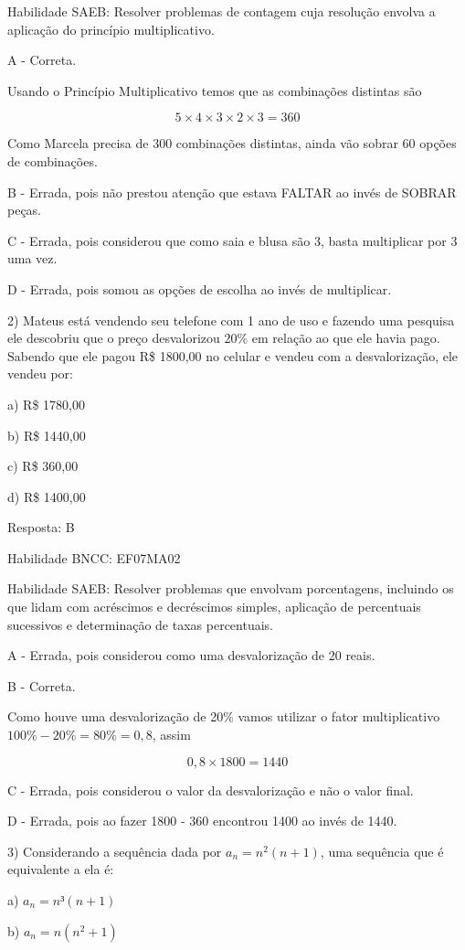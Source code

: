 Habilidade SAEB: Resolver problemas de contagem cuja resolução envolva a
aplicação do princípio multiplicativo.

A - Correta.

Usando o Princípio Multiplicativo temos que as combinações distintas são

\[5 \times 4 \times 3 \times 2 \times 3 = 360\]

Como Marcela precisa de 300 combinações distintas, ainda vão sobrar 60
opções de combinações.

B - Errada, pois não prestou atenção que estava FALTAR ao invés de
SOBRAR peças.

C - Errada, pois considerou que como saia e blusa são 3, basta
multiplicar por 3 uma vez.

D - Errada, pois somou as opções de escolha ao invés de multiplicar.

2) Mateus está vendendo seu telefone com 1 ano de uso e fazendo uma
pesquisa ele descobriu que o preço desvalorizou 20\% em relação ao que
ele havia pago. Sabendo que ele pagou R\$ 1800,00 no celular e vendeu
com a desvalorização, ele vendeu por:

a) R\$ 1780,00

b) R\$ 1440,00

c) R\$ 360,00

d) R\$ 1400,00

Resposta: B

Habilidade BNCC: EF07MA02

Habilidade SAEB: Resolver problemas que envolvam porcentagens, incluindo
os que lidam com acréscimos e decréscimos simples, aplicação de
percentuais sucessivos e determinação de taxas percentuais.

A - Errada, pois considerou como uma desvalorização de 20 reais.

B - Correta.

Como houve uma desvalorização de 20\% vamos utilizar o fator
multiplicativo \(100\% - 20\% = 80\% = 0,8\), assim

\[0,8 \times 1800 = 1440\]

C - Errada, pois considerou o valor da desvalorização e não o valor
final.

D - Errada, pois ao fazer 1800 - 360 encontrou 1400 ao invés de 1440.

3) Considerando a sequência dada por \(a_{n} = n^2(n + 1)\), uma
sequência que é equivalente a ela é:

a) \(a_{n} = n³(n + 1)\)

b) \(a_{n} = n(n^2 + 1)\)

